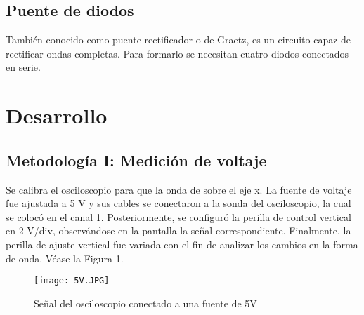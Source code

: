 \documentclass[conference]{IEEEtran} %
\begin{document}
\subsection{Puente de diodos}
También conocido como puente rectificador o de Graetz, es un circuito capaz de rectificar ondas completas. Para formarlo se necesitan cuatro diodos conectados en serie.~\cite{puenteDiodos}


\section{Desarrollo}
\subsection{Metodología I: Medición de voltaje}
Se calibra el osciloscopio para que la onda de sobre el eje x.
La fuente de voltaje fue ajustada a 5 V y sus cables se conectaron a la sonda del osciloscopio, la cual se colocó en el canal 1. Posteriormente, se configuró la perilla de control vertical en 2 V/div, observándose en la pantalla la señal correspondiente. Finalmente, la perilla de ajuste vertical fue variada con el fin de analizar los cambios en la forma de onda. Véase la Figura 1.
\begin{figure}[H]
    \centering
    \texttt{[image: 5V.JPG]}
    \caption{Señal del osciloscopio conectado a una fuente de 5V}
    \label{fig:placeholder}
\end{figure}
\end{document}
